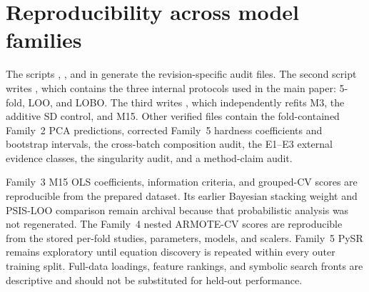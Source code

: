\documentclass[a4paper,11pt]{article}
\begin{document}
\section{Reproducibility across model families}
\label{si:diagnostics}

The scripts , , and  in  generate the revision-specific audit files. The second script writes , which contains the three internal protocols used in the main paper: 5-fold, LOO, and LOBO. The third writes , which independently refits M3, the additive SD control, and M15. Other verified files contain the fold-contained Family~2 PCA predictions, corrected Family~5 hardness coefficients and bootstrap intervals, the cross-batch composition audit, the E1--E3 external evidence classes, the singularity audit, and a method-claim audit.

Family~3 M15 OLS coefficients, information criteria, and grouped-CV scores are reproducible from the prepared dataset. Its earlier Bayesian stacking weight and PSIS-LOO comparison remain archival because that probabilistic analysis was not regenerated. The Family~4 nested ARMOTE-CV scores are reproducible from the stored per-fold studies, parameters, models, and scalers. Family~5 PySR remains exploratory until equation discovery is repeated within every outer training split. Full-data loadings, feature rankings, and symbolic search fronts are descriptive and should not be substituted for held-out performance.



\end{document}
